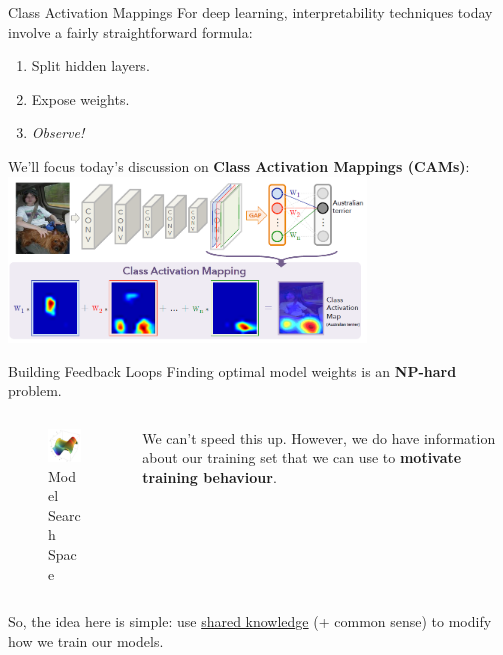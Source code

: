 \documentclass{beamer}
\begin{document}
\begin{frame}{Class Activation Mappings}
	For deep learning, interpretability techniques today involve a fairly straightforward formula: \pause
	\begin{enumerate}[label=-]
		\item Split hidden layers.
		\item Expose weights.
		\item \textit{Observe!} \pause
	\end{enumerate}
	We'll focus today's discussion on \textbf{Class Activation Mappings (CAMs)}:
	\vspace{1em} \includegraphics[width=9.5cm]{img/cams}
\end{frame}

\begin{frame}{Building Feedback Loops}
	Finding optimal model weights is an \textbf{NP-hard} problem. \pause \\
	\begin{columns}
		\begin{column}{.5\textwidth}
			\begin{figure}
				\includegraphics[width=4.5cm]{img/np}
				\caption*{\footnotesize Model Search Space}
			\end{figure} \pause
		\end{column}
		\begin{column}{.5\textwidth}
			We can't speed this up. However, we do have information about our training set that we can use to \textbf{motivate training behaviour}. \pause \newline \\
		\end{column}
	\end{columns}
	So, the idea here is simple: use \underline{shared knowledge} (+ common sense) to modify how we train our models.
\end{frame}
\end{document}
